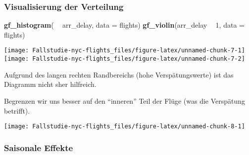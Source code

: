 \documentclass[]{article}
\newenvironment{Shaded}{\begin{snugshade}}{\end{snugshade}}
\newcommand{\DataTypeTok}[1]{\textcolor[rgb]{0.13,0.29,0.53}{#1}}
\newcommand{\DecValTok}[1]{\textcolor[rgb]{0.00,0.00,0.81}{#1}}
\newcommand{\KeywordTok}[1]{\textcolor[rgb]{0.13,0.29,0.53}{\textbf{#1}}}
\newcommand{\NormalTok}[1]{#1}
\newcommand{\OperatorTok}[1]{\textcolor[rgb]{0.81,0.36,0.00}{\textbf{#1}}}
\newcommand{\StringTok}[1]{\textcolor[rgb]{0.31,0.60,0.02}{#1}}
\begin{document}
\hypertarget{visualisierung-der-verteilung}{%
\subsubsection{Visualisierung der
Verteilung}\label{visualisierung-der-verteilung}}

\begin{Shaded}
\begin{Highlighting}[]
\KeywordTok{gf_histogram}\NormalTok{( }\OperatorTok{~}\StringTok{ }\NormalTok{arr_delay, }\DataTypeTok{data =}\NormalTok{ flights)}
\KeywordTok{gf_violin}\NormalTok{(arr_delay }\OperatorTok{~}\StringTok{ }\DecValTok{1}\NormalTok{, }\DataTypeTok{data =}\NormalTok{ flights)}
\end{Highlighting}
\end{Shaded}

\begin{center}\texttt{[image: Fallstudie-nyc-flights\_files/figure-latex/unnamed-chunk-7-1]} \texttt{[image: Fallstudie-nyc-flights\_files/figure-latex/unnamed-chunk-7-2]} \end{center}

Aufgrund des langen rechten Randbereichs (hohe Verspätungswerte) ist das
Diagramm nicht sher hilfreich.

Begrenzen wir uns besser auf den ``inneren'' Teil der Flüge (was die
Verspätung betrifft).

\begin{Shaded}
\end{Shaded}

\begin{center}\texttt{[image: Fallstudie-nyc-flights\_files/figure-latex/unnamed-chunk-8-1]} \end{center}

\hypertarget{saisonale-effekte}{%
\subsubsection{Saisonale Effekte}\label{saisonale-effekte}}
\end{document}

